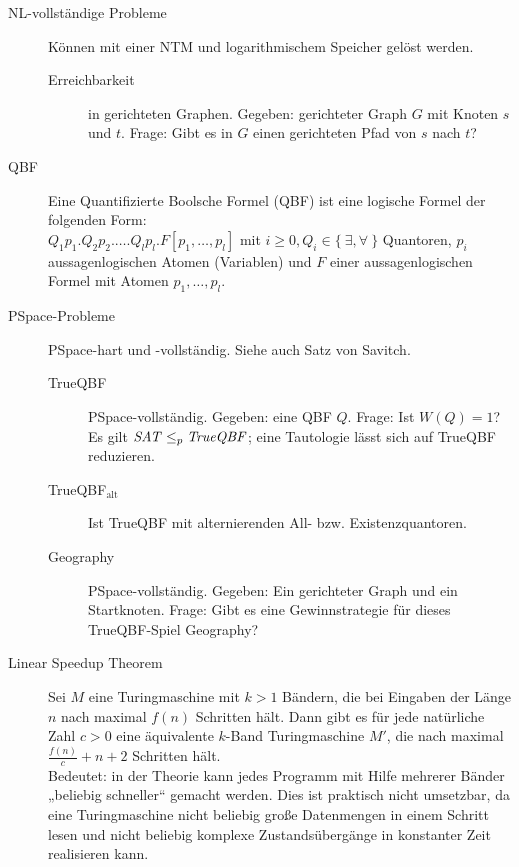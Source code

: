 \begin{description}
        \item[NL-vollständige Probleme] Können mit einer NTM und logarithmischem Speicher gelöst werden.
            \begin{description}
                \item[Erreichbarkeit] in gerichteten Graphen. Gegeben: gerichteter Graph $G$ mit Knoten $s$ und $t$. Frage: Gibt es in $G$ einen gerichteten Pfad von $s$ nach $t$?
            \end{description}

        \item[QBF] Eine Quantifizierte Boolsche Formel (QBF) ist eine logische Formel der folgenden Form: \\
            $Q_{1}p_{1}.Q_{2}p_{2}.\dots.Q_{l}p_{l}.F[p_{1},\dots,p_{l}]$ mit $i \geq 0, Q_{i} \in \{\ \exists, \forall\ \}$ Quantoren, $p_{i}$ aussagenlogischen Atomen (Variablen) und $F$ einer aussagenlogischen Formel mit Atomen $p_{1},\dots,p_{l}$. 

        \item[PSpace-Probleme] PSpace-hart und -vollständig. Siehe auch Satz von Savitch.  
            \begin{description}
                \item[TrueQBF] PSpace-vollständig. Gegeben: eine QBF $Q$. Frage: Ist $W(Q) = 1$? \\
                    Es gilt $\mathit{SAT} \leq_{p} \mathit{TrueQBF}$; eine Tautologie lässt sich auf TrueQBF reduzieren.
                \item[TrueQBF$_{\text{alt}}$] Ist TrueQBF mit alternierenden All- bzw. Existenzquantoren.
                \item[Geography] PSpace-vollständig. Gegeben: Ein gerichteter Graph und ein Startknoten. Frage: Gibt es eine Gewinnstrategie für dieses TrueQBF-Spiel Geography?
            \end{description}

        \item[Linear Speedup Theorem] Sei $M$ eine Turingmaschine mit $k > 1$ Bändern, die bei Eingaben der Länge $n$ nach maximal $f(n)$ Schritten hält. Dann gibt es für jede natürliche Zahl $c > 0$ eine äquivalente $k$-Band Turingmaschine $M'$, die nach maximal $\frac{f(n)}{c} + n + 2$ Schritten hält. \\
        Bedeutet: in der Theorie kann jedes Programm mit Hilfe mehrerer Bänder „beliebig schneller“ gemacht werden. Dies ist praktisch nicht umsetzbar, da eine Turingmaschine nicht beliebig große Datenmengen in einem Schritt lesen und nicht beliebig komplexe Zustandsübergänge in konstanter Zeit realisieren kann.


\end{description}
